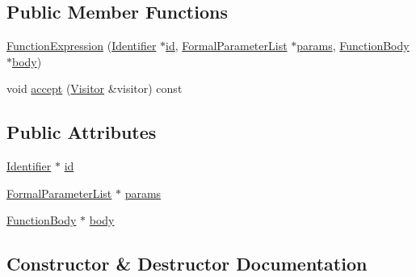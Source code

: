 \subsection*{Public Member Functions}
\begin{DoxyCompactItemize}
\item 
\hyperlink{struct_function_expression_aae0ca9ebecd1bdd51e7c7440c8cf2ec3}{Function\+Expression} (\hyperlink{struct_identifier}{Identifier} $\ast$\hyperlink{struct_function_expression_a448321d33ff9d2603dfdb0b14cf4fe24}{id}, \hyperlink{struct_formal_parameter_list}{Formal\+Parameter\+List} $\ast$\hyperlink{struct_function_expression_a5d02f2d692ae86ebdc36a3963042af65}{params}, \hyperlink{struct_function_body}{Function\+Body} $\ast$\hyperlink{struct_function_expression_af08f7dfdb616e122ab79c9a2e706061e}{body})
\item 
void \hyperlink{struct_function_expression_a4808466a4242254555340a7e9c5e6dac}{accept} (\hyperlink{struct_visitor}{Visitor} \&visitor) const
\end{DoxyCompactItemize}
\subsection*{Public Attributes}
\begin{DoxyCompactItemize}
\item 
\hyperlink{struct_identifier}{Identifier} $\ast$ \hyperlink{struct_function_expression_a448321d33ff9d2603dfdb0b14cf4fe24}{id}
\item 
\hyperlink{struct_formal_parameter_list}{Formal\+Parameter\+List} $\ast$ \hyperlink{struct_function_expression_a5d02f2d692ae86ebdc36a3963042af65}{params}
\item 
\hyperlink{struct_function_body}{Function\+Body} $\ast$ \hyperlink{struct_function_expression_af08f7dfdb616e122ab79c9a2e706061e}{body}
\end{DoxyCompactItemize}


\subsection{Constructor \& Destructor Documentation}
\mbox{\label{struct_function_expression_aae0ca9ebecd1bdd51e7c7440c8cf2ec3}} 
